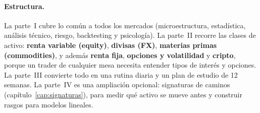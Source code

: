 \paragraph{Estructura.} La parte~I cubre lo común a todos los mercados (microestructura, estadística,
análisis técnico, riesgo, backtesting y psicología). La parte~II recorre las clases de activo:
\textbf{renta variable (equity)}, \textbf{divisas (FX)}, \textbf{materias primas (commodities)}, y además
\textbf{renta fija}, \textbf{opciones y volatilidad} y \textbf{cripto}, porque un trader de cualquier
mesa necesita entender tipos de interés y opciones. La parte~III convierte todo en una rutina diaria y
un plan de estudio de 12 semanas. La parte~IV es una ampliación opcional: signaturas de caminos
(capítulo~\ref{cap:signaturas}), para medir qué activo se mueve antes y construir rasgos para modelos lineales.
